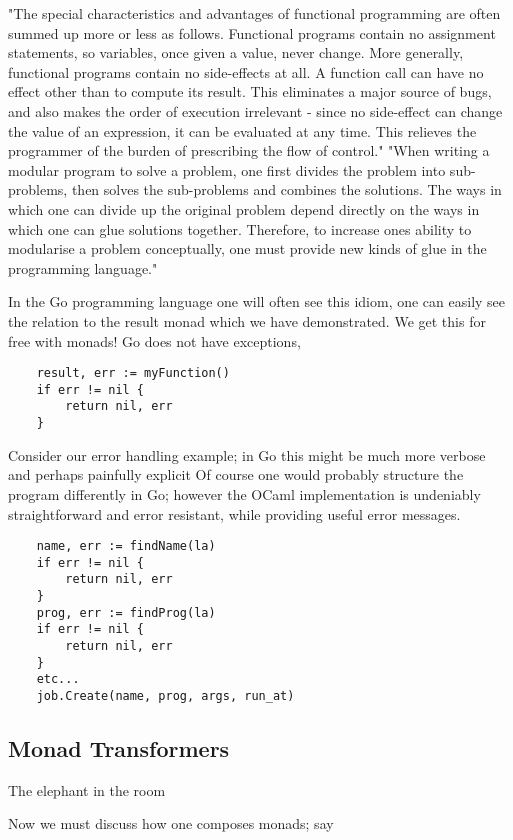 "The special characteristics and advantages of functional programming are often summed up more or less as follows. Functional programs contain no assignment statements, so variables, once given a value, never change. More generally, functional programs contain no side-effects at all. A function call can have no effect other than to compute its result. This eliminates a major source of bugs, and also makes the order of execution irrelevant - since no side-effect can change the value of an expression, it can be evaluated at any time. This relieves the programmer of the burden of prescribing the flow of control."
"When writing a modular program to solve a problem, one first divides the problem into sub- problems, then solves the sub-problems and combines the solutions. The ways in which one can divide up the original problem depend directly on the ways in which one can glue solutions together. Therefore, to increase ones ability to modularise a problem conceptually, one must provide new kinds of glue in the programming language."
\cite{hughes1989functional}

In the Go programming language one will often see this idiom,
one can easily see the relation to the result monad which we
have demonstrated.
We get this for free with monads!
Go does not have exceptions,

\begin{verbatim}
    result, err := myFunction()
    if err != nil {
        return nil, err
    }
\end{verbatim}

Consider our error handling example;
in Go this might be much more verbose
and perhaps painfully explicit
Of course one would probably structure the program differently in Go;
however the OCaml implementation is undeniably straightforward
and error resistant, while providing useful error messages.

\begin{verbatim}
    name, err := findName(la)
    if err != nil {
        return nil, err
    }
    prog, err := findProg(la)
    if err != nil {
        return nil, err
    }
    etc...
    job.Create(name, prog, args, run_at)
\end{verbatim}

\subsection{Monad Transformers}
The elephant in the room

Now we must discuss how one composes monads;
say

